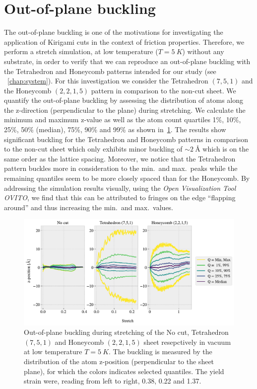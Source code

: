 \section{Out-of-plane buckling}\label{sec:out-of-plane_buckling}
The out-of-plane buckling is one of the motivations for investigating
the application of Kirigami cuts in the context of friction properties. Therefore, we perform a stretch simulation, at low temperature ($T = \SI{5}{K}$) without any substrate, in order to verify that we can reproduce an out-of-plane buckling with the Tetrahedron and Honeycomb patterns intended for our study (see ~\cref{chap:system}). For this investigation we consider the Tetrahedron $(7,5,1)$ and the Honeycomb $(2,2,1,5)$ pattern in comparison to the non-cut sheet. We quantify the out-of-plane buckling by assessing the distribution of atoms along the z-direction (perpendicular to the plane) during stretching. We calculate the
minimum and maximum z-value as well as the atom count quartiles 1\%, 10\%, 25\%, 50\% (median), 75\%, 90\% and 99\% as shown in~\cref{fig:buckling_quartiles}. The results show significant buckling for the Tetrahedron and Honeycomb patterns in comparison to the non-cut sheet which only exhibits minor
buckling of $\sim \SI{2}{\text{Å}}$ which is on the same order as the lattice spacing. Moreover, we notice that the Tetrahedron pattern buckles more in consideration to the min.\ and max.\ peaks while the remaining quantiles seem to be more closely spaced than for the Honeycomb. By addressing the simulation results visually, using the \textit{Open Visualization Tool OVITO}, we find that this can be attributed to fringes on the edge ``flapping around'' and thus increasing the min.\ and max.\ values.

\begin{figure}[H]
  \centering
  \includegraphics[width=\linewidth]{figures/baseline/vacuum_normal_buckling.pdf}
  \caption{Out-of-plane buckling during stretching of the No cut, Tetrahedron $(7,5,1)$ and Honeycomb $(2,2,1,5)$ sheet resepctively in vacuum at low temperature $T = \SI{5}{K}$. The buckling is measured by the distribution of the atom z-position (perpendicular to the sheet plane), for which the colors indicates selected quantiles. The yield strain were, reading from left to right, 0.38, 0.22 and 1.37.}
  \label{fig:buckling_quartiles}
\end{figure}

